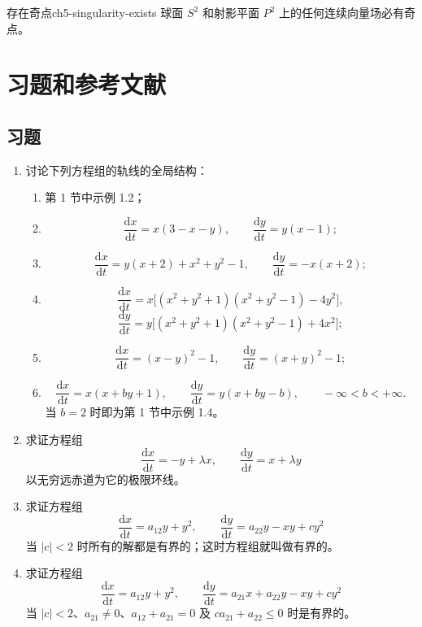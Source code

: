 \begin{corollary}{存在奇点}{ch5-singularity-exists}
球面 $S^2$ 和射影平面 $P^2$ 上的任何连续向量场必有奇点。
\end{corollary}

\section*{习题和参考文献}
\subsection*{习题}

\begin{enumerate}
  \item 讨论下列方程组的轨线的全局结构：
  \begin{enumerate}
    \item 第 1 节中示例 1.2；
    \item \[
      \dfrac{\mathrm{d}x}{\mathrm{d}t}=x(3-x-y),\qquad
      \dfrac{\mathrm{d}y}{\mathrm{d}t}=y(x-1);
    \]
    \item \[
      \dfrac{\mathrm{d}x}{\mathrm{d}t}=y(x+2)+x^2+y^2-1,\qquad
      \dfrac{\mathrm{d}y}{\mathrm{d}t}=-x(x+2);
    \]
    \item \[
      \dfrac{\mathrm{d}x}{\mathrm{d}t}=x\bigl[(x^2+y^2+1)(x^2+y^2-1)-4y^2\bigr],
    \]
    \[
      \dfrac{\mathrm{d}y}{\mathrm{d}t}=y\bigl[(x^2+y^2+1)(x^2+y^2-1)+4x^2\bigr];
    \]
    \item \[
      \dfrac{\mathrm{d}x}{\mathrm{d}t}=(x-y)^2-1,\qquad
      \dfrac{\mathrm{d}y}{\mathrm{d}t}=(x+y)^2-1;
    \]
    \item \[
      \dfrac{\mathrm{d}x}{\mathrm{d}t}=x(x+by+1),\qquad
      \dfrac{\mathrm{d}y}{\mathrm{d}t}=y(x+by-b),\qquad -\infty<b<+\infty.
    \]
    当 $b=2$ 时即为第 1 节中示例 1.4。
  \end{enumerate}

  \item 求证方程组
  \[
    \dfrac{\mathrm{d}x}{\mathrm{d}t}=-y+\lambda x,\qquad
    \dfrac{\mathrm{d}y}{\mathrm{d}t}=x+\lambda y
  \]
  以无穷远赤道为它的极限环线。

  \item 求证方程组
  \[
    \dfrac{\mathrm{d}x}{\mathrm{d}t}=a_{12}y+y^2,\qquad
    \dfrac{\mathrm{d}y}{\mathrm{d}t}=a_{22}y-xy+cy^2
  \]
  当 $|c|<2$ 时所有的解都是有界的；这时方程组就叫做有界的。

  \item 求证方程组
  \[
    \dfrac{\mathrm{d}x}{\mathrm{d}t}=a_{12}y+y^2,\qquad
    \dfrac{\mathrm{d}y}{\mathrm{d}t}=a_{21}x+a_{22}y-xy+cy^2
  \]
  当 $|c|<2$、$a_{21}\ne0$、$a_{12}+a_{21}=0$ 及
  $ca_{21}+a_{22}\le0$ 时是有界的。


\end{enumerate}
